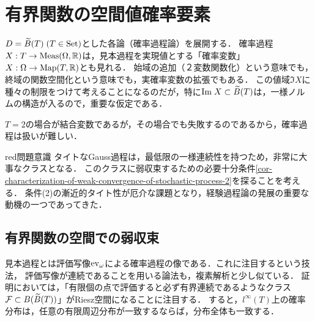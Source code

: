 \documentclass[uplatex,dvipdfmx]{jsreport}
\begin{document}
\section{有界関数の空間値確率要素}

\begin{tcolorbox}[colframe=ForestGreen, colback=ForestGreen!10!white,breakable,colbacktitle=ForestGreen!40!white,coltitle=black,fonttitle=\bfseries\sffamily,
    title=動機付け]
    $D=\widetilde{B}(T)\;(T\in\mathrm{Set})$とした各論（確率過程論）を展開する．
    確率過程$X:T\to\mathrm{Meas}(\Omega,\mathbb{R})$は，見本過程を実現値とする「確率変数」$X:\Omega\to\mathrm{Map}(T,\mathbb{R})$とも見れる．
    始域の追加（２変数関数化）という意味でも，終域の関数空間化という意味でも，実確率変数の拡張でもある．
    この値域$\Im X$に種々の制限をつけて考えることになるのだが，特に$\mathrm{Im}\; X\subset\widetilde{B}(T)$は，一様ノルムの構造が入るので，重要な仮定である．

    $T=2$の場合が結合変数であるが，その場合でも失敗するのであるから，確率過程は扱いが難しい．
\end{tcolorbox}

\begin{tbox}{red}{問題意識}
    タイトなGauss過程は，最低限の一様連続性を持つため，非常に大事なクラスとなる．
    このクラスに弱収束するための必要十分条件\ref{cor-characterization-of-weak-convergence-of-stochastic-process-2}を探ることを考える．
    条件(2)の漸近的タイト性が厄介な課題となり，経験過程論の発展の重要な動機の一つであってきた．
\end{tbox}

\subsection{有界関数の空間での弱収束}

\begin{tcolorbox}[colframe=ForestGreen, colback=ForestGreen!10!white,breakable,colbacktitle=ForestGreen!40!white,coltitle=black,fonttitle=\bfseries\sffamily,
title=]
    見本過程とは評価写像$\mathrm{ev}_\omega$による確率過程の像である．これに注目するという技法，
    評価写像が連続であることを用いる論法も，複素解析と少し似ている．
    証明においては，「有限個の点で評価すると必ず有界連続であるようなクラス$\mathcal{F}\subset B(\widetilde{B}(T))$」がRiesz空間になることに注目する．
    すると，$l^\infty(T)$上の確率分布は，任意の有限周辺分布が一致するならば，分布全体も一致する．
\end{tcolorbox}
\end{document}
